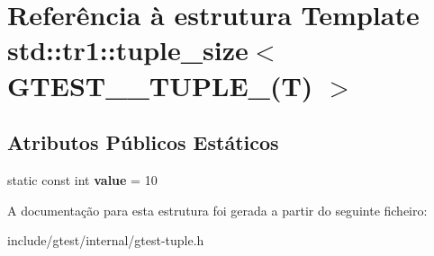 \hypertarget{structstd_1_1tr1_1_1tuple__size_3_01GTEST__10__TUPLE___07T_08_01_4}{\section{Referência à estrutura Template std\-:\-:tr1\-:\-:tuple\-\_\-size$<$ G\-T\-E\-S\-T\-\_\-\_\-\-T\-U\-P\-L\-E\-\_\-(T) $>$}
\label{structstd_1_1tr1_1_1tuple__size_3_01GTEST__10__TUPLE___07T_08_01_4}
}
\subsection*{Atributos Públicos Estáticos}
\begin{DoxyCompactItemize}
\item 
\hypertarget{structstd_1_1tr1_1_1tuple__size_3_01GTEST__10__TUPLE___07T_08_01_4_a8181de395f9761be991e4cbdef144373}{static const int {\bfseries value} = 10}\label{structstd_1_1tr1_1_1tuple__size_3_01GTEST__10__TUPLE___07T_08_01_4_a8181de395f9761be991e4cbdef144373}

\end{DoxyCompactItemize}


A documentação para esta estrutura foi gerada a partir do seguinte ficheiro\-:\begin{DoxyCompactItemize}
\item 
include/gtest/internal/gtest-\/tuple.\-h\end{DoxyCompactItemize}
